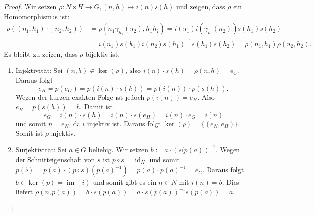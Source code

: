 \documentclass[12pt]{scrartcl} %
\DeclareMathOperator{\id}{id}
\DeclareMathOperator{\im}{im}
\newcommand{\inv}[1]{\left(#1\right)^{-1}}
\newcommand{\Inv}[1]{#1^{-1}}
\theoremstyle{definition}
\theoremstyle{remark}
\begin{document}
\begin{proof}
	Wir setzen $\rho: N\rtimes H \to G, (n,h)\mapsto i(n)s(h)$ und zeigen, dass $\rho$ ein Homomorphismus ist:
	\begin{align*}
		\rho((n_1,h_1)\cdot (n_2,h_2)) &= \rho(n_1\gamma_{h_1}(n_2), h_1h_2) = i(n_1)i(\gamma_{h_1}(n_2))s(h_1)s(h_2)\\
		&= i(n_1)s(h_1)i(n_2)\Inv{s(h_1)}s(h_1)s(h_2) = \rho(n_1,h_1)\rho(n_2,h_2).
	\end{align*}
	Es bleibt zu zeigen, dass $\rho$ bijektiv ist.
	\begin{enumerate}
	\item Injektivität: Sei $(n,h)\in \ker(\rho)$, also \(i(n)\cdot s(h) = \rho(n, h) = e_G\).
		Daraus folgt \[e_H = p(e_G) = p(i(n)\cdot s(h)) = p(i(n))\cdot p(s(h)).\]
		Wegen der kurzen exakten Folge ist jedoch $p(i(n)) = e_H$.
		Also $e_H = p(s(h)) = h$.
		Damit ist \[e_G = i(n)\cdot s(h) = i(n)\cdot s(e_H) = i(n)\cdot e_G = i(n)\] und somit $n=e_N$, da $i$ injektiv ist.
		Daraus folgt $\ker(\rho) = \{(e_N,e_H)\}$.
		Somit ist $\rho$ injektiv.
	\item Surjektivität: Sei $a\in G$ beliebig.
		Wir setzen $b := a\cdot\inv{s(p(a)}$.
		Wegen der Schnitteigenschaft von $s$ ist $p\circ s = \id_H$ und somit $p(b) = p(a)\cdot (p\circ s)(\Inv{p(a)})=p(a)\cdot\Inv{p(a)}=e_G$.
		Daraus folgt $b\in\ker(p)= \im(i)$ und somit gibt es ein $n\in N$ mit $i(n) = b$.
		Dies liefert $\rho(n,p(a)) = b\cdot s(p(a))=a\cdot s(p(a))^{-1}s(p(a))=a$. \qedhere
	\end{enumerate}
\end{proof}
\end{document}
